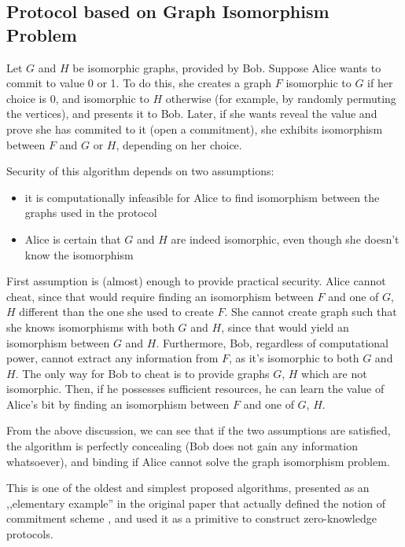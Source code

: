\documentclass[10pt]{article}
\begin{document}
\subsection*{Protocol based on Graph Isomorphism Problem}

Let \(G\) and \(H\) be isomorphic graphs, provided by Bob. Suppose Alice wants to commit to value 0
or 1. To do this, she creates a graph \(F\) isomorphic to \(G\) if her choice is 0, and isomorphic 
to \(H\) otherwise (for example, by randomly permuting the vertices), and presents it to Bob. Later,
if she wants reveal the value and prove she has commited to it (open a commitment), she exhibits 
isomorphism between \(F\) and \(G\) or \(H\), depending on her choice.

Security of this algorithm depends on two assumptions:

\begin{itemize}
  \item it is computationally infeasible for Alice to find isomorphism between the graphs used in the
    protocol
  \item Alice is certain that \(G\) and \(H\) are indeed isomorphic, even though she doesn't know
    the isomorphism
\end{itemize}

First assumption is (almost) enough to provide practical security. Alice cannot cheat, since that would
require finding an isomorphism between \(F\) and one of \(G\), \(H\) different than the one she used to
create \(F\). She cannot create graph such that she knows isomorphisms with both \(G\) and \(H\), since
that would yield an isomorphism between \(G\) and \(H\). Furthermore, Bob, regardless of computational
power, cannot extract any information from \(F\), as it's isomorphic to both \(G\) and \(H\). The only 
way for Bob to cheat is to provide graphs \(G\), \(H\) which are not isomorphic. Then, if he possesses
sufficient resources, he can learn the value of Alice's bit by finding an isomorphism between \(F\) and
one of \(G\), \(H\).

From the above discussion, we can see that if the two assumptions are satisfied, the algorithm is
perfectly concealing (Bob does not gain any information whatsoever), and binding if Alice cannot solve
the graph isomorphism problem.

This is one of the oldest and simplest proposed algorithms, presented as an ,,elementary example'' 
in the original paper that actually defined the notion of commitment scheme \cite{Brassard88}, and 
used it as a primitive to construct zero-knowledge protocols.
\end{document}
